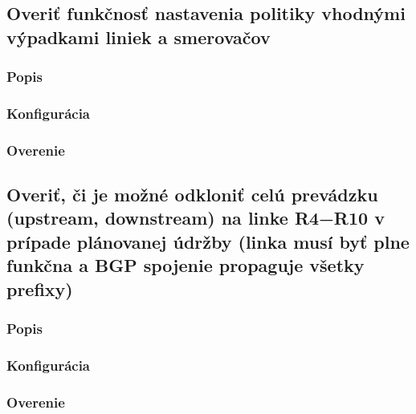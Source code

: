 \documentclass[12pt,twoside,a4paper]{report}
\begin{document}
\paragraph{}







\subsection{Overiť funkčnosť nastavenia politiky vhodnými výpadkami liniek a smerovačov}
\subsubsection{Popis}
\paragraph{}

\subsubsection{Konfigurácia}
\paragraph{}

\subsubsection{Overenie}
\paragraph{}







\subsection{Overiť, či je možné odkloniť celú prevádzku (upstream, downstream) na linke R4−R10 v prípade plánovanej údržby (linka musí byť plne funkčna a BGP spojenie propaguje všetky prefixy)}
\subsubsection{Popis}
\paragraph{}

\subsubsection{Konfigurácia}
\paragraph{}

\subsubsection{Overenie}
\paragraph{}
\end{document}
